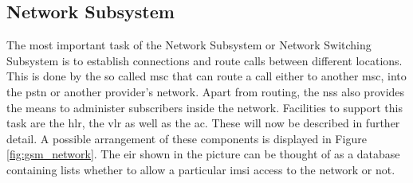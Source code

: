 \begin{table}
\centering
{}
\hspace{.5cm}
\caption{Mobile Country and Network Codes. (R) denotes that the MCC is reserved but not operational as of yet, whereas (T) denotes a operational test network.}
\label{tab:countrycodes}
\end{table}

\subsection{Network Subsystem}
\label{sec:nss}
The most important task of the Network Subsystem or Network Switching Subsystem is to establish connections and route calls between different locations.
This is done by the so called \gls{msc} that can route a call either to another \gls{msc}, into the \gls{pstn} or another provider's network.
Apart from routing, the \gls{nss} also provides the means to administer subscribers inside the network.
Facilities to support this task are the \gls{hlr}, the \gls{vlr} as well as the \gls{ac}.
These will now be described in further detail.
A possible arrangement of these components is displayed in Figure \ref{fig:gsm_network}.
The \gls{eir} shown in the picture can be thought of as a database containing lists whether to allow a particular \gls{imsi} access to the network or not.

